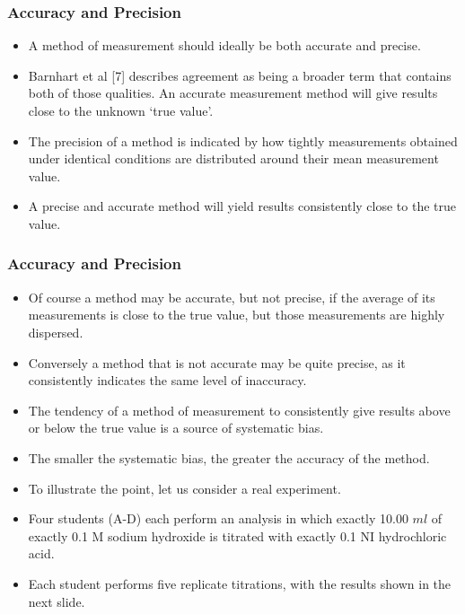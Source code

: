 \documentclass[compress]{beamer}        %
\begin{document}
\begin{frame}
\frametitle{Accuracy and Precision}
\large
\begin{itemize}
\item
A method of measurement should ideally be both accurate and
precise. 
\item Barnhart et al [7] describes agreement as being a broader
term that contains both of those qualities. An accurate
measurement method will give results close to the unknown `true
value'. \item The precision of a method is indicated by how tightly
measurements obtained under identical conditions are distributed
around their mean measurement value.\item A precise and accurate method
will yield results consistently close to the true value. 
\end{itemize}
\end{frame}
\begin{frame}
\frametitle{Accuracy and Precision}
\large
\begin{itemize}
\item Of course
a method may be accurate, but not precise, if the average of its
measurements is close to the true value, but those measurements
are highly dispersed. 
\item
Conversely a method that is not accurate may
be quite precise, as it consistently indicates the same level of
inaccuracy. 
\item The tendency of a method of measurement to
consistently give results above or below the true value is a
source of systematic bias. 
\item The smaller the systematic bias, the
greater the accuracy of the method.
\end{itemize}
\end{frame}
\begin{frame}
\begin{itemize}
\item To illustrate the point,  let
us consider a real experiment.\\

\item Four students (A-D) each perform an analysis in which exactly 10.00 $ml$
of exactly 0.1 M sodium hydroxide is titrated with exactly 0.1 NI
hydrochloric acid.
\item 
Each student performs five replicate titrations, with the results shown in the next slide.
\end{itemize}
\end{frame}
\end{document}
